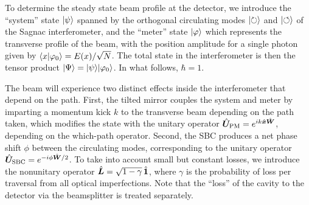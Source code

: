 To determine the steady state beam profile at the detector, we introduce the ``system'' state $\lvert \psi\rangle$ spanned by the orthogonal circulating modes $\lvert \circlearrowright\rangle$ and $\lvert \circlearrowleft\rangle$ of the Sagnac interferometer, and the ``meter'' state $\lvert \varphi\rangle$ which represents the transverse profile of the beam, with the position amplitude for a single photon given by $\langle x \vert \varphi_0 \rangle = E(x)/\sqrt{N}$.  The total state in the interferometer is then the tensor product $\lvert \Psi\rangle = \lvert \psi\rangle\lvert \varphi_0\rangle$. In what follows, $\hbar = 1$.  

The beam will experience two distinct effects inside the interferometer that depend on the path.  First, the tilted mirror couples the system and meter by imparting a momentum kick $k$ to the transverse beam depending on the path taken, which modifies the state with the unitary operator $\hat{\bm U}_{\rm PM} = e^{ik\hat{\bm x}\hat{\bm W}}$, depending on the which-path operator.  Second, the SBC produces a net phase shift $\phi$ between the circulating modes, corresponding to the unitary operator $\hat{\bm U}_{\rm SBC} = e^{-i\phi\hat{\bm W}/2}$.  To take into account small but constant losses, we introduce the nonunitary operator $\hat{\bm L} = \sqrt{1-\gamma}\,\hat{\bm 1}$, where $\gamma$ is the probability of loss per traversal from all optical imperfections.  Note that the ``loss'' of the cavity to the detector via the beamsplitter is treated separately.



